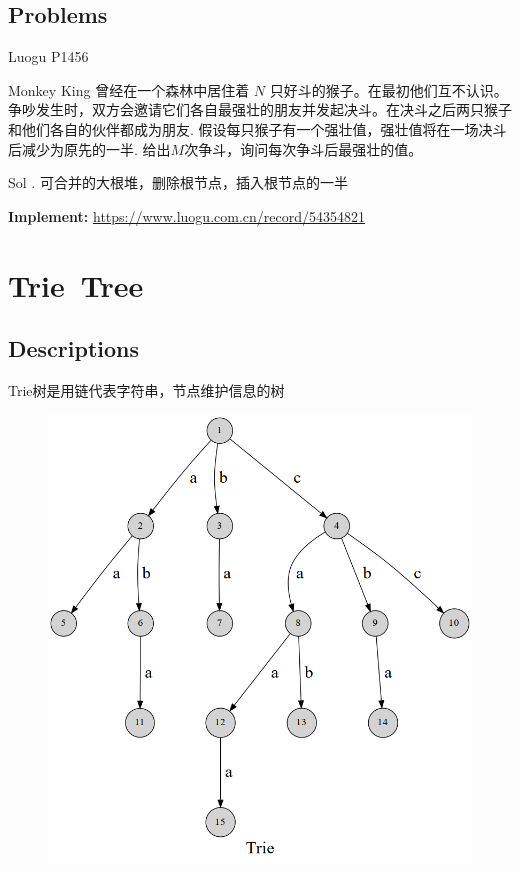 \documentclass{beamer}
\begin{document}
\subsection{Problems}

\begin{frame}{Luogu P1456}
    \begin{block}{Monkey King}
        曾经在一个森林中居住着 $N$ 只好斗的猴子。在最初他们互不认识。争吵发生时，双方会邀请它们各自最强壮的朋友并发起决斗。在决斗之后两只猴子和他们各自的伙伴都成为朋友.
        假设每只猴子有一个强壮值，强壮值将在一场决斗后减少为原先的一半.
        给出$M$次争斗，询问每次争斗后最强壮的值。
    \end{block}
    \pause
    \begin{block}{Sol .}
        可合并的大根堆，删除根节点，插入根节点的一半
        
        \textbf{Implement:} \url{https://www.luogu.com.cn/record/54354821}
    \end{block}
\end{frame}



\section{Trie\ Tree}

\subsection{Descriptions}

\begin{frame}[fragile]
Trie树是用链代表字符串，节点维护信息的树

\begin{figure}
  \centering
  \includegraphics[scale=0.20]{pic/trie1.png}
\end{figure}

\end{frame}
\end{document}
